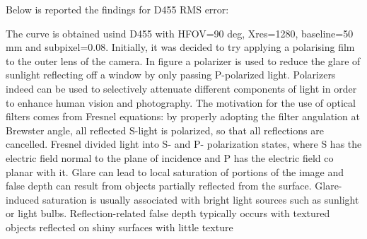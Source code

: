 Below is reported the findings for D455 RMS error:
\begin{center}
    

\end{center}
The  curve is obtained usind D455 with HFOV=90 deg, Xres=1280, baseline=50 mm and subpixel=0.08.
Initially, it was decided to try applying a polarising film to the outer lens of the camera.
In figure a polarizer is used to reduce the glare of sunlight reflecting off a window by only passing P-polarized light.
Polarizers indeed can be used to selectively attenuate different components of light in order to enhance human vision and photography. The motivation for the use of optical filters comes from Fresnel equations: by properly adopting the filter angulation at Brewster angle, all reflected S-light is polarized, so that all reflections are cancelled. Fresnel divided light into S- and P- polarization states, where S has the electric field normal to the plane of incidence and P has the electric field co planar with it.
Glare can lead to local saturation of portions of the image and false depth can result from objects partially reflected from the surface. Glare-induced saturation is usually associated with bright light sources such as sunlight or light bulbs. Reflection-related false depth typically occurs with textured objects reflected on shiny surfaces with little texture


